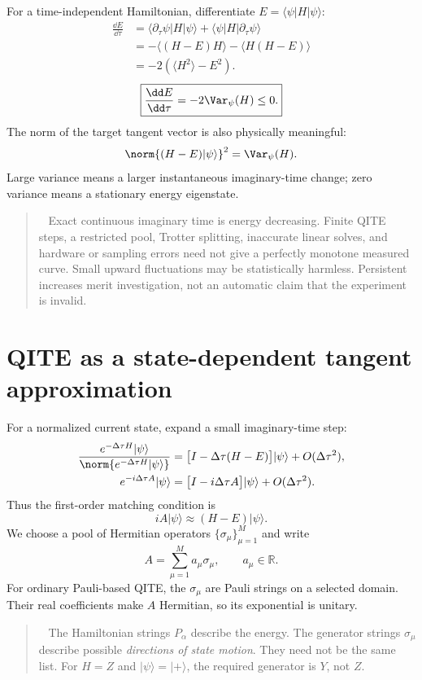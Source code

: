 \documentclass[11pt,a4paper]{article}
\newcommand{\ket}[1]{\lvert #1\rangle}
\newcommand{\bra}[1]{\langle #1\rvert}
\newcommand{\ex}[1]{\langle #1\rangle}
\newcommand{\dt}{\Delta\tau}
\newcommand{\lesson}[2]{\clearpage\section{#1}\label{#2}}
\newenvironment{idea}[1][Main idea]{\par\smallskip\begin{quotation}\noindent{\bfseries\textcolor{keyblue}{#1.}}\ }{\end{quotation}\smallskip}
\newenvironment{caution}[1][Important distinction]{\par\smallskip\begin{quotation}\noindent{\bfseries\textcolor{alertred}{#1.}}\ }{\end{quotation}\smallskip}
\begin{document}
For a time-independent Hamiltonian, differentiate $E=\bra{\psi}H\ket{\psi}$:
\begin{align*}
\frac{\dd E}{\dd\tau}
&=\bra{\partial_\tau\psi}H\ket{\psi}
 +\bra{\psi}H\ket{\partial_\tau\psi}\\
&=-\ex{(H-E)H}-\ex{H(H-E)}\\
&=-2(\ex{H^2}-E^2).
\end{align*}
\begin{equation}
\boxed{\frac{\dd E}{\dd\tau}=-2\Var_\psi(H)\le0.}
\label{eq:descent}
\end{equation}
The norm of the target tangent vector is also physically meaningful:
\[
\norm{(H-E)\ket{\psi}}^2=\Var_\psi(H).
\]
Large variance means a larger instantaneous imaginary-time change; zero variance means a stationary energy eigenstate.

\begin{caution}[Use the diagnostic correctly]
Exact continuous imaginary time is energy decreasing. Finite QITE steps, a restricted pool, Trotter splitting, inaccurate linear solves, and hardware or sampling errors need not give a perfectly monotone measured curve. Small upward fluctuations may be statistically harmless. Persistent increases merit investigation, not an automatic claim that the experiment is invalid.
\end{caution}

\lesson{QITE as a state-dependent tangent approximation}{sec:basic}
For a normalized current state, expand a small imaginary-time step:
\begin{align*}
\frac{e^{-\dt H}\ket{\psi}}{\norm{e^{-\dt H}\ket{\psi}}}
&=\bigl[I-\dt(H-E)\bigr]\ket{\psi}+O(\dt^2),\\
e^{-i\dt A}\ket{\psi}
&=\bigl[I-i\dt A\bigr]\ket{\psi}+O(\dt^2).
\end{align*}
Thus the first-order matching condition is
\begin{equation}
\boxed{iA\ket{\psi}\approx(H-E)\ket{\psi}.}
\label{eq:tangent}
\end{equation}
We choose a pool of Hermitian operators $\{\sigma_\mu\}_{\mu=1}^{M}$ and write
\[
A=\sum_{\mu=1}^{M}a_\mu\sigma_\mu,\qquad a_\mu\in\mathbb R.
\]
For ordinary Pauli-based QITE, the $\sigma_\mu$ are Pauli strings on a selected domain. Their real coefficients make $A$ Hermitian, so its exponential is unitary.

\begin{idea}[Do not equate the two operator lists]
The Hamiltonian strings $P_\alpha$ describe the energy. The generator strings $\sigma_\mu$ describe possible \emph{directions of state motion}. They need not be the same list. For $H=Z$ and $\ket{\psi}=\ket{+}$, the required generator is $Y$, not $Z$.
\end{idea}
\end{document}
